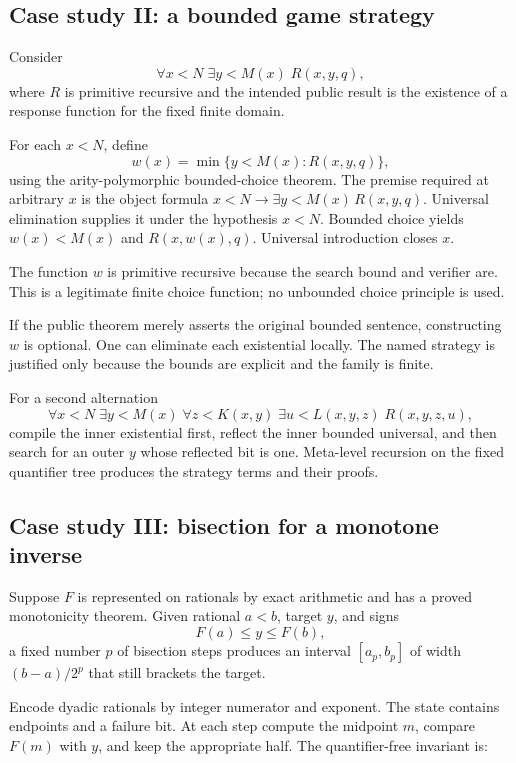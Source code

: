 \subsection{Case study II: a bounded game strategy}

Consider
\[
 \forall x<N\;\exists y<M(x)\;R(x,y,q),
\]
where \(R\) is primitive recursive and the intended public result is the existence of a response
function for the fixed finite domain.

For each \(x<N\), define
\[
 w(x)=\min\{y<M(x):R(x,y,q)\},
\]
using the arity-polymorphic bounded-choice theorem.  The premise required at arbitrary \(x\) is the
object formula \(x<N\to\exists y<M(x)\,R(x,y,q)\).  Universal elimination supplies it under the
hypothesis \(x<N\).  Bounded choice yields \(w(x)<M(x)\) and \(R(x,w(x),q)\).  Universal
introduction closes \(x\).

The function \(w\) is primitive recursive because the search bound and verifier are.  This is a
legitimate finite choice function; no unbounded choice principle is used.

If the public theorem merely asserts the original bounded sentence, constructing \(w\) is optional.
One can eliminate each existential locally.  The named strategy is justified only because the
bounds are explicit and the family is finite.

For a second alternation
\[
 \forall x<N\;\exists y<M(x)\;\forall z<K(x,y)\;\exists u<L(x,y,z)\;R(x,y,z,u),
\]
compile the inner existential first, reflect the inner bounded universal, and then search for an outer
\(y\) whose reflected bit is one.  Meta-level recursion on the fixed quantifier tree produces the
strategy terms and their proofs.

\subsection{Case study III: bisection for a monotone inverse}

Suppose \(F\) is represented on rationals by exact arithmetic and has a proved monotonicity theorem.
Given rational \(a<b\), target \(y\), and signs
\[
 F(a)\le y\le F(b),
\]
a fixed number \(p\) of bisection steps produces an interval \([a_p,b_p]\) of width
\((b-a)/2^p\) that still brackets the target.

Encode dyadic rationals by integer numerator and exponent.  The state contains endpoints and a
failure bit.  At each step compute the midpoint \(m\), compare \(F(m)\) with \(y\), and keep the
appropriate half.  The quantifier-free invariant is:

